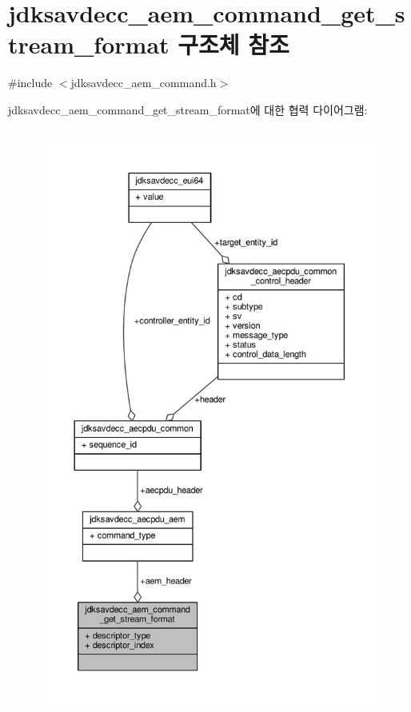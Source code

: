\hypertarget{structjdksavdecc__aem__command__get__stream__format}{}\section{jdksavdecc\+\_\+aem\+\_\+command\+\_\+get\+\_\+stream\+\_\+format 구조체 참조}
\label{structjdksavdecc__aem__command__get__stream__format}


{\ttfamily \#include $<$jdksavdecc\+\_\+aem\+\_\+command.\+h$>$}



jdksavdecc\+\_\+aem\+\_\+command\+\_\+get\+\_\+stream\+\_\+format에 대한 협력 다이어그램\+:
\nopagebreak
\begin{figure}[H]
\begin{center}
\leavevmode
\includegraphics[height=550pt]{structjdksavdecc__aem__command__get__stream__format__coll__graph}
\end{center}
\end{figure}
